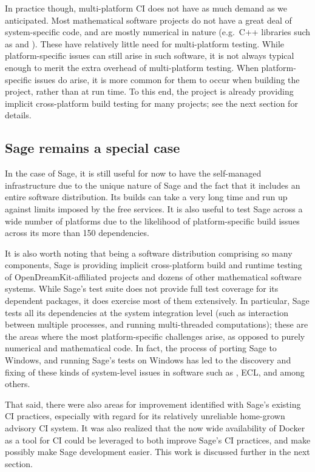 \documentclass{deliverablereport}
\begin{document}
In practice though, multi-platform CI does not have as much demand as we
anticipated.  Most mathematical software projects do not have a great deal of
system-specific code, and are mostly numerical in nature (e.g.~C++ libraries
such as \Linbox and \Givaro).  These have relatively little need for
multi-platform testing.  While platform-specific issues can still arise in such
software, it is not always typical enough to merit the extra overhead of
multi-platform testing.  When platform-specific issues do arise, it is more
common for them to occur when building the project, rather than at run time.
To this end, the \Sage project is already providing implicit cross-platform
build testing for many projects; see the next section for details.


\subsection{Sage remains a special case}
In the case of Sage, it is still useful for now to have the self-managed
infrastructure due to the unique nature of Sage and the fact that it includes
an entire software distribution.  Its builds can take a very long time and run
up against limits imposed by the free services.  It is also useful to test
Sage across a wide number of platforms due to the likelihood of
platform-specific build issues across its more than 150 dependencies.

It is also worth noting that being a software distribution comprising so many
components, Sage is providing implicit cross-platform build and runtime testing of
OpenDreamKit-affiliated projects and dozens of other mathematical software
systems.  While Sage's test suite does not provide full test coverage for its
dependent packages, it does exercise most of them extensively.  In particular,
Sage tests all its dependencies at the system integration level (such as
interaction between multiple processes, and running multi-threaded
computations); these are the areas where the most platform-specific challenges
arise, as opposed to purely numerical and mathematical code.  In fact, the
process of porting Sage to Windows, and running Sage's tests on Windows
 has led to the discovery and fixing of these kinds of
system-level issues in software such as \GAP, ECL, and \PariGP among
others.

That said, there were also areas for improvement identified with Sage's
existing CI practices, especially with regard for its relatively unreliable
home-grown advisory CI system.  It was also realized that the now wide
availability of Docker as a tool for CI could be leveraged to both improve
Sage's CI practices, and make possibly make Sage development easier.  This
work is discussed further in the next section.
\end{document}
